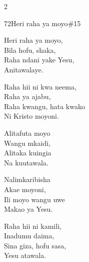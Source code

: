 \documentclass{article}
\begin{document}
\begin{multicols}{2}
\begin{hymn}{72}{Heri raha ya moyo}{\#15}
\begin{stanza}
Heri raha ya moyo,\\
Bila hofu, shaka,\\
Raha ndani yake Yesu,\\
Anitawalaye.
\end{stanza}
\begin{stanza}
Raha hii ni kwa neema,\\
Raha ya ajabu,\\
Raha kwangu, hata kwako\\
Ni Kristo moyoni.
\end{stanza}
\begin{stanza}
Alitafuta moyo\\
Wangu mkaidi,\\
Alitaka kuingia\\
Na kuutawala.
\end{stanza}
\begin{stanza}
Nalimkaribisha\\
Akae moyoni,\\
Ili moyo wangu uwe\\
Makao ya Yesu.
\end{stanza}
\begin{stanza}
Raha hii ni kamili,\\
Inadumu daima,\\
Sina giza, hofu sasa,\\
Yesu atawala.
\end{stanza}
\end{hymn}


\end{multicols}
\end{document}
